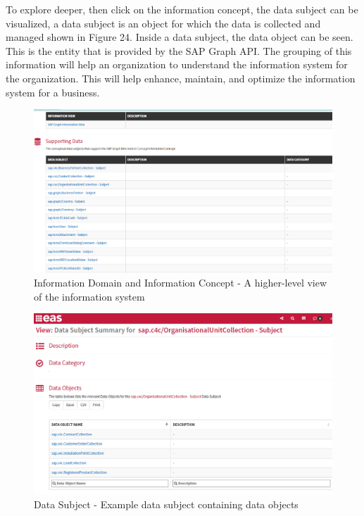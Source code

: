\documentclass{article}
\begin{document}
To explore deeper, then click on the information concept, the data subject can be visualized, a data subject is an object for which the data is collected and managed shown in Figure 24. Inside a data subject, the data object can be seen. This is the entity that is provided by the SAP Graph API. The grouping of this information will help an organization to understand the information system for the organization. This will help enhance, maintain, and optimize the information system for a business. 

\begin{figure}[ht!]
    \centering
    \includegraphics[scale=0.3]{ev-ds}
    \caption{Information Domain and Information Concept  - 
A higher-level view of the information system }
    \label{fig:information-concept-insight}
\end{figure}

\begin{figure}[ht!]
    \centering
    \includegraphics[scale=0.3]{ev-ds-sum}
    \caption{Data Subject  - 
Example  data subject containing data objects }
    \label{fig:data-subject-summary}
\end{figure}
\end{document}
